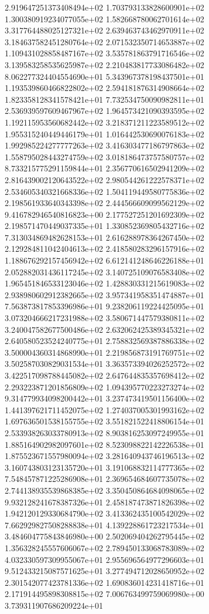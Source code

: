 2.919647251373408494e+02 1.703793133828600901e+02 1.300380919234077055e+02
1.582668780062701614e+02 3.317764488025127321e+02 2.639463743462970911e+02
3.184637582451280764e+02 2.071532350714653887e+02 1.109431028858487167e+02
3.535781863791716546e+02 3.139583258535625987e+02 2.210483817733086482e+02
8.062277324404554690e+01 5.343967378198437501e+01 1.193539860466822802e+02
2.594181876314908664e+02 1.823358128341578421e+01 7.732534750090982811e+01
2.536939597609467967e+02 1.964573421090393595e+02 1.192115953560682442e+02
3.218371211223589512e+02 1.955315240449446179e+01 1.016442530690076183e+02
1.992985224277777263e+02 3.416303477186797863e+02 1.558795028443274759e+02
3.018186473757580757e+02 8.733215775291159844e+01 2.356770616502941209e+02
2.816439002120643522e+02 2.980544261222578371e+02 2.534605340321668336e+02
1.504119449580775836e+02 2.198561933640343398e+02 2.444566609099562129e+02
9.416782946540816823e+00 2.177527251201692309e+02 2.198571470449037335e+01
1.330852369805432716e+02 7.313034869482628153e+01 2.616288978364267450e+02
2.129284811042404613e+02 2.418580283296157916e+02 1.188676292157456942e+02
6.612141248646226188e+01 2.052882031436117245e+02 3.140725109076583408e+02
1.965451846533123046e+02 1.428830331215619083e+02 2.938980602912382665e+02
3.957341958351474887e+01 7.563873817853396986e+01 9.238206119224425095e+01
3.073204666217231988e+02 3.580671447579380811e+02 3.240047582677500486e+02
2.632062425389345321e+02 2.640580523524240775e+01 2.758832569387886338e+02
3.500004360314868990e+01 2.219856873191769751e+02 3.502587030829031534e+01
3.363573394026252572e+02 3.422517098788445082e+02 2.647644835357698412e+02
2.293223871201856809e+02 1.094395770223273274e+02 9.314779934098200442e+01
3.237473419501156400e+02 1.441397621711452075e+02 1.274037005301993162e+02
1.697636501538155755e+02 3.551821522418806154e+01 2.533938263033780913e+02
8.903816253097249955e+01 1.885164902982097601e+02 8.523098822142226538e+01
1.875523671557980094e+02 3.281640943746196513e+02 3.160743803123135720e+01
3.191068832114777365e+02 7.548457871225286908e+01 2.369654684607735078e+02
2.744138935539868385e+02 3.350450864684098065e+02 9.932128241678387326e+01
2.458187473871826398e+02 1.942120129330684790e+02 3.413362435100542029e+02
7.662929827508288838e+01 4.139228861723217534e+01 3.484604775843846980e+00
2.502069404262795445e+02 1.356328245557606067e+02 2.789450133068783089e+02
4.032330597309955067e+01 2.955696564977296603e+01 9.512433215087571625e+01
3.277494712028650952e+02 2.301542077423781336e+02 1.690836014231418716e+01
2.171914495898308815e+02 7.006763499759069980e+00 3.739311907686209224e+01
